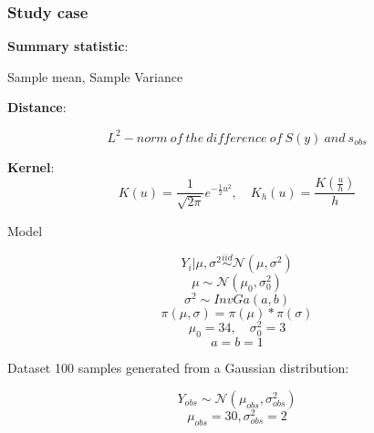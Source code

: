 \documentclass{beamer}
\begin{document}
\begin{frame}
	\frametitle{Study case}
	
	\textbf{Summary statistic}: \\
	\begin{center}
		Sample mean, Sample Variance
	\end{center}
	
	\textbf{Distance}: 
	\begin{center}
		$$L^2-norm\ of\ the\ difference\ of\ S(y)\ and\ s_{obs}$$
	\end{center}   %
	
	\textbf{Kernel}: 
	$$
	K(u) = 
	\frac{1}{\sqrt{2\pi}} e^{-\frac{1}{2}u^2}, 
	\quad K_h(u) 
	= \frac{K(\frac u h)}{h}
	$$
	
\end{frame}

\begin{frame}
	
	\begin{block}{Model}
		\begin{center}
			
			$$ Y_i | \mu, \sigma^2 \overset{iid}{\sim} \mathcal{N}(\mu, \sigma^2) $$
			$$ \mu  \sim \mathcal{N}(\mu_0, \sigma_0^2)  $$
			$$ \sigma^2  \sim InvGa(a,b) $$
			$$ \pi( \mu,\sigma) =\pi(\mu)*\pi(\sigma) $$
			$$ \mu_0 = 34, \quad \sigma^2_0 = 3$$
			$$ a=b=1 $$
			
		\end{center}
	\end{block}
	
\end{frame}

\begin{frame}
	\begin{block}{Dataset}
		100 samples generated from a Gaussian distribution:
		\begin{center}
			$$ Y_{obs} \sim \mathcal{N}(\mu_{obs}, \sigma_{obs}^{2}) $$
			$$	\mu_{obs} = 30,	\sigma_{obs}^{2} = 2	$$
		\end{center}
	\end{block}
	
\end{frame}
\end{document}
